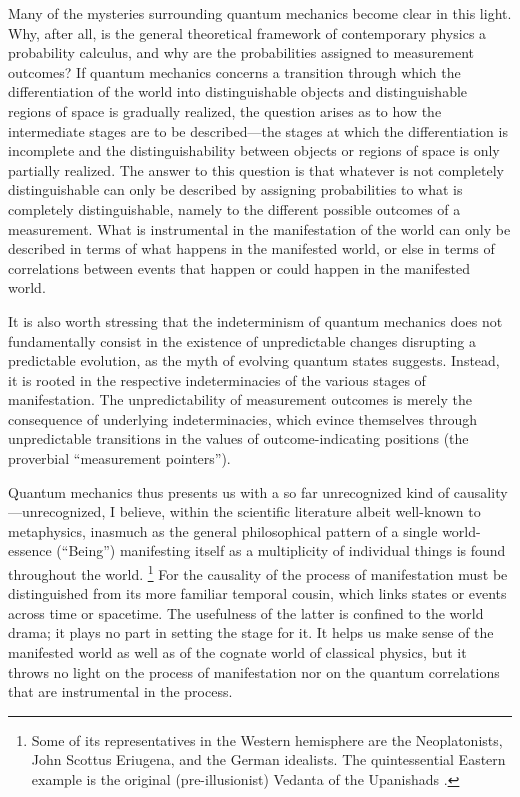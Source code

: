 Many of the mysteries surrounding quantum mechanics become clear in this light. Why, after all, is the general theoretical framework of contemporary physics a probability calculus, and why are the probabilities assigned to measurement outcomes? If quantum mechanics concerns a transition through which the differentiation of the world into distinguishable objects and distinguishable regions of space is gradually realized, the question arises as to how the intermediate stages are to be described---the stages at which the differentiation is incomplete and the distinguishability between objects or regions of space is only partially realized. The answer to this question is that whatever is not completely distinguishable can only be described by assigning probabilities to what is completely distinguishable, namely to the different possible outcomes of a measurement. What is instrumental in the manifestation of the world can only be described in terms of what happens in the manifested world, or else in terms of correlations between events that happen or could happen in the manifested world.

It is also worth stressing that the indeterminism of quantum mechanics does not fundamentally consist in the existence of unpredictable changes disrupting a predictable evolution, as the myth of evolving quantum states suggests. Instead, it is rooted in the respective indeterminacies of the various stages of manifestation. The unpredictability of measurement outcomes is merely the consequence of underlying indeterminacies, which evince themselves through unpredictable transitions in the values of outcome-indicating positions (the proverbial ``measurement pointers'').

Quantum mechanics thus presents us with a so far unrecognized kind of cau\-sal\-ity---unrecognized, I believe, within the scientific literature albeit well-known to metaphysics, inasmuch as the general philosophical pattern of a single world-essence (``Being'') manifesting itself as a multiplicity of individual things is found throughout the world.%
\footnote{Some of its representatives in the Western hemisphere are the Neoplatonists, John Scottus Eriugena, and the German idealists. The quintessential Eastern example is the original (pre-illusionist) Vedanta of the Upanishads \citep{Phillips,SA1,SA3}.}
For the causality of the process of manifestation must be distinguished from its more familiar temporal cousin, which links states or events across time or spacetime. The usefulness of the latter is confined to the world drama; it plays no part in setting the stage for it. It helps us make sense of the manifested world as well as of the cognate world of classical physics, but it throws no light on the process of manifestation nor on the quantum correlations that are instrumental in the process.

